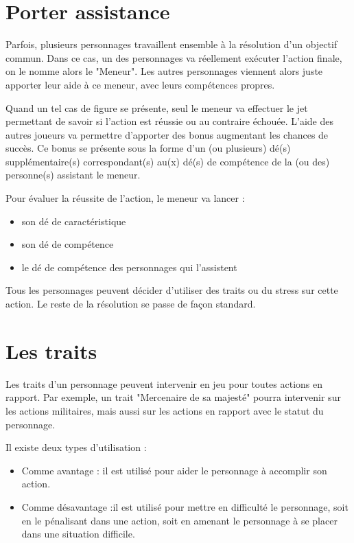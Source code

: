 \documentclass{conf/FusinaClass}
\begin{document}
\chapter{Porter assistance}
Parfois, plusieurs personnages travaillent ensemble à la résolution d'un objectif commun. Dans ce cas, un des personnages va réellement exécuter l'action finale, on le nomme alors le "Meneur". Les autres personnages viennent alors juste apporter leur aide à ce meneur, avec leurs compétences propres.

Quand un tel cas de figure se présente, seul le meneur va effectuer le jet permettant de savoir si l'action est réussie ou au contraire échouée. L'aide des autres joueurs va permettre d'apporter des bonus augmentant les chances de succès. Ce bonus se présente sous la forme d'un (ou plusieurs) dé(s) supplémentaire(s) correspondant(s) au(x) dé(s) de compétence de la (ou des) personne(s) assistant le meneur.

Pour évaluer la réussite de l'action, le meneur va lancer :

\begin{itemize}
\item son dé de caractéristique
\item son dé de compétence
\item le dé de compétence des personnages qui l'assistent
\end{itemize}

Tous les personnages peuvent décider d'utiliser des traits ou du stress sur cette action. Le reste de la résolution se passe de façon standard.

\chapter{Les traits}
Les traits d'un personnage peuvent intervenir en jeu pour toutes actions en rapport. Par exemple, un trait "Mercenaire de sa majesté" pourra intervenir sur les actions militaires, mais aussi sur les actions en rapport avec le statut du personnage.

Il existe deux types d'utilisation :

\begin{itemize}
\item Comme avantage : il est utilisé pour aider le personnage à accomplir son action.
\item Comme désavantage :il est utilisé pour mettre en difficulté le personnage, soit en le pénalisant dans une action, soit en amenant le personnage à se placer dans une situation difficile.
\end{itemize}
\end{document}
